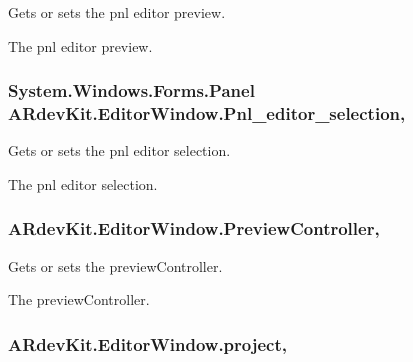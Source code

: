 Gets or sets the pnl editor preview. 

The pnl editor preview. \hypertarget{class_a_rdev_kit_1_1_editor_window_a601e295ca226828c6ca4eadc21101a78}{
\subsubsection[{Pnl\-\_\-editor\-\_\-selection}]{\setlength{\rightskip}{0pt plus 5cm}System.\-Windows.\-Forms.\-Panel A\-Rdev\-Kit.\-Editor\-Window.\-Pnl\-\_\-editor\-\_\-selection\hspace{0.3cm}{\ttfamily [get]}, {\ttfamily [set]}}}\label{class_a_rdev_kit_1_1_editor_window_a601e295ca226828c6ca4eadc21101a78}


Gets or sets the pnl editor selection. 

The pnl editor selection. \hypertarget{class_a_rdev_kit_1_1_editor_window_ae57e383a1684241c86a5253d1fd8197a}{
\subsubsection[{Preview\-Controller}]{ A\-Rdev\-Kit.\-Editor\-Window.\-Preview\-Controller\hspace{0.3cm}{\ttfamily [get]}, {\ttfamily [set]}}}\label{class_a_rdev_kit_1_1_editor_window_ae57e383a1684241c86a5253d1fd8197a}


Gets or sets the preview\-Controller. 

The preview\-Controller. \hypertarget{class_a_rdev_kit_1_1_editor_window_aa7e64c912e3d904fae0ec52588be0baa}{
\subsubsection[{project}]{ A\-Rdev\-Kit.\-Editor\-Window.\-project\hspace{0.3cm}{\ttfamily [get]}, {\ttfamily [set]}}}\label{class_a_rdev_kit_1_1_editor_window_aa7e64c912e3d904fae0ec52588be0baa}


